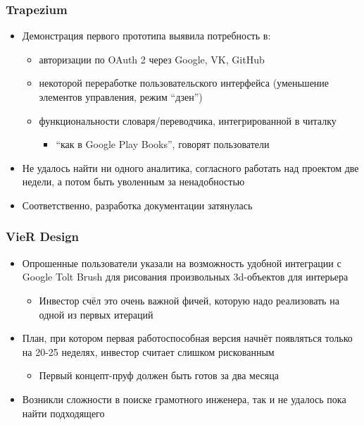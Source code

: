 \documentclass[xetex,mathserif,serif]{beamer}
\begin{document}
	\begin{frame}
		\frametitle{Trapezium}
		\begin{itemize}
			\item Демонстрация первого прототипа выявила потребность в:
			\begin{itemize}
				\item авторизации по OAuth 2 через Google, VK, GitHub
				\item некоторой переработке пользовательского интерфейса (уменьшение элементов управления, режим ``дзен'')
				\item функциональности словаря/переводчика, интегрированной в читалку
				\begin{itemize}
					\item ``как в Google Play Books'', говорят пользователи
				\end{itemize}
			\end{itemize}
			\item Не удалось найти ни одного аналитика, согласного работать над проектом две недели, а потом быть уволенным за ненадобностью
			\item Соответственно, разработка документации затянулась
		\end{itemize}
	\end{frame}

	\begin{frame}
		\frametitle{VieR Design}
		\begin{itemize}
			\item Опрошенные пользователи указали на возможность удобной интеграции с Google Tolt Brush для рисования произвольных 3d-объектов для интерьера
			\begin{itemize}
				\item Инвестор счёл это очень важной фичей, которую надо реализовать на одной из первых итераций
			\end{itemize}
			\item План, при котором первая работоспособная версия начнёт появляться только на 20-25 неделях, инвестор считает слишком рискованным
			\begin{itemize}
				\item Первый концепт-пруф должен быть готов за два месяца
			\end{itemize}
			\item Возникли сложности в поиске грамотного инженера, так и не удалось пока найти подходящего
		\end{itemize}
	\end{frame}
\end{document}

